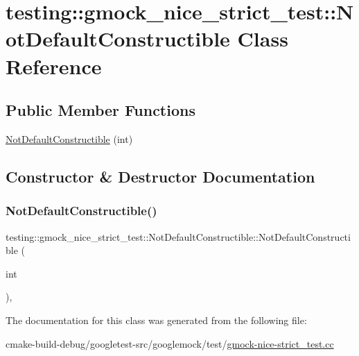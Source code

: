 \hypertarget{classtesting_1_1gmock__nice__strict__test_1_1NotDefaultConstructible}{}\section{testing\+::gmock\+\_\+nice\+\_\+strict\+\_\+test\+::Not\+Default\+Constructible Class Reference}
\label{classtesting_1_1gmock__nice__strict__test_1_1NotDefaultConstructible}
\subsection*{Public Member Functions}
\begin{DoxyCompactItemize}
\item 
\mbox{\hyperlink{classtesting_1_1gmock__nice__strict__test_1_1NotDefaultConstructible_acfaca2e03925805192b698708d6030bc}{Not\+Default\+Constructible}} (int)
\end{DoxyCompactItemize}


\subsection{Constructor \& Destructor Documentation}
\mbox{\label{classtesting_1_1gmock__nice__strict__test_1_1NotDefaultConstructible_acfaca2e03925805192b698708d6030bc}} 
\subsubsection{\texorpdfstring{NotDefaultConstructible()}{NotDefaultConstructible()}}
{\footnotesize\ttfamily testing\+::gmock\+\_\+nice\+\_\+strict\+\_\+test\+::\+Not\+Default\+Constructible\+::\+Not\+Default\+Constructible (\begin{DoxyParamCaption}\item[{int}]{ }\end{DoxyParamCaption})\hspace{0.3cm}{\ttfamily [inline]}, {\ttfamily [explicit]}}



The documentation for this class was generated from the following file\+:\begin{DoxyCompactItemize}
\item 
cmake-\/build-\/debug/googletest-\/src/googlemock/test/\mbox{\hyperlink{gmock-nice-strict__test_8cc}{gmock-\/nice-\/strict\+\_\+test.\+cc}}\end{DoxyCompactItemize}
